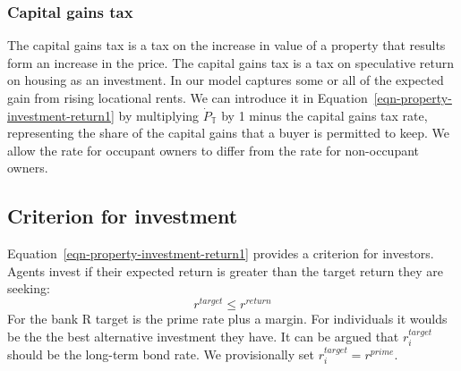 \subsubsection{Capital gains tax}
The \gls{capital gains tax} is %
a tax on the increase in value of a property that results form an increase in the price. The capital gains tax is a tax on speculative return on housing as an investment. In our model captures some or all of the expected gain from rising locational rents. We can introduce it in Equation~\ref{eqn-property-investment-return1} by multiplying $\dot P_\mathbb{T}$ by 1 minus the capital gains tax rate, representing the share of the capital gains that a buyer is permitted to keep. We allow the rate for occupant owners to differ from the rate for non-occupant owners.


\subsection{Criterion for investment}
Equation~\ref{eqn-property-investment-return1} provides a criterion for investors. %
 Agents invest if  their expected return is greater than the target return they are seeking:
\begin{equation}
r^{target}\le r^{return} 
\label{eqn-property-investment-return2}
\end{equation}
For the bank R target is the prime rate plus a margin. For individuals it woulds be the the best alternative investment they have. It can be argued that  $r^{target}_i$ should be the long-term bond rate. We provisionally set $r^{target}_i=r^{prime}$.

